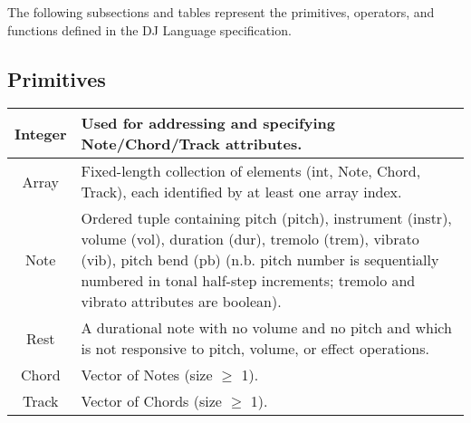 \documentclass[letterpaper]{article}
\begin{document}
The following subsections and tables represent the primitives, operators, and functions defined in the DJ Language specification.

\begin{samepage}
\subsection{Primitives}
\begin{table}[H]
\centering
\begin{tabularx}{.75\textwidth}{|c|X|}
\hline
Integer & Used for addressing and specifying Note/Chord/Track attributes. \\
\hline
Array & Fixed-length collection of elements (int, Note, Chord, Track), each identified by at least one array index. \\
\hline
Note & Ordered tuple containing pitch (pitch), instrument (instr), volume (vol), duration (dur), tremolo (trem), vibrato (vib), pitch bend (pb) (n.b. pitch number is sequentially numbered in tonal half-step increments; tremolo and vibrato attributes are boolean). \\
\hline
Rest & A durational note with no volume and no pitch and which is not responsive to pitch, volume, or effect operations. \\
\hline
Chord & Vector of Notes (size $\geq$ 1). \\
\hline
Track & Vector of Chords (size $\geq$ 1). \\
\hline
\end{tabularx}
\end{table}
\end{samepage}
\end{document}

